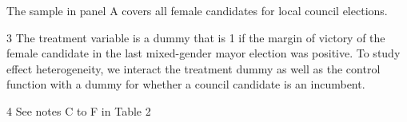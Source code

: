 \begin{table}[H]
\begin{center}
{\begin{threeparttable}
\begin{tablenotes}
\begin{small}
The
sample
in
panel
A
covers
all
female
candidates
for
local
council
elections.
\item[3]
The
treatment
variable
is
a
dummy
that
is
1
if
the
margin
of
victory
of
the
female
candidate
in
the
last
mixed-gender
mayor
election
was
positive.
To
study
effect
heterogeneity,
we
interact
the
treatment
dummy
as
well
as
the
control
function
with
a
dummy
for
whether
a
council
candidate
is
an
incumbent.
\item[4]
See
notes C to F
in
Table
2
\end{small}
\end{tablenotes} \end{threeparttable} } \end{center} \end{table}
